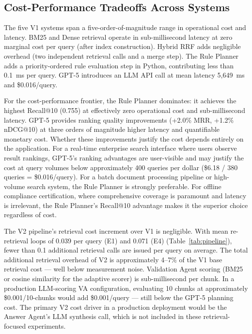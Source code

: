 \documentclass[11pt, a4paper]{article}
\begin{document}
\subsection{Cost-Performance Tradeoffs Across Systems}

The five V1 systems span a five-order-of-magnitude range in operational cost and latency. BM25 and Dense retrieval operate in sub-millisecond latency at zero marginal cost per query (after index construction). Hybrid RRF adds negligible overhead (two independent retrieval calls and a merge step). The Rule Planner adds a priority-ordered rule evaluation step in Python, contributing less than 0.1~ms per query. GPT-5 introduces an LLM API call at mean latency 5,649~ms and \$0.016/query.

For the cost-performance frontier, the Rule Planner dominates: it achieves the highest Recall@10 (0.755) at effectively zero operational cost and sub-millisecond latency. GPT-5 provides ranking quality improvements (+2.0\% MRR, +1.2\% nDCG@10) at three orders of magnitude higher latency and quantifiable monetary cost. Whether these improvements justify the cost depends entirely on the application. For a real-time enterprise search interface where users observe result rankings, GPT-5's ranking advantages are user-visible and may justify the cost at query volumes below approximately 400 queries per dollar (\$6.18 / 380 queries = \$0.016/query). For a batch document processing pipeline or high-volume search system, the Rule Planner is strongly preferable. For offline compliance certification, where comprehensive coverage is paramount and latency is irrelevant, the Rule Planner's Recall@10 advantage makes it the superior choice regardless of cost.

The V2 pipeline's retrieval cost increment over V1 is negligible. With mean re-retrieval loops of 0.039 per query (E1) and 0.071 (E4) (Table~\ref{tab:pipeline}), fewer than 0.1 additional retrieval calls are issued per query on average. The total additional retrieval overhead of V2 is approximately 4--7\% of the V1 base retrieval cost --- well below measurement noise. Validation Agent scoring (BM25 or cosine similarity for the adaptive scorer) is sub-millisecond per chunk. In a production LLM-scoring VA configuration, evaluating 10 chunks at approximately \$0.001/10-chunks would add \$0.001/query --- still below the GPT-5 planning cost. The primary V2 cost driver in a production deployment would be the Answer Agent's LLM synthesis call, which is not included in these retrieval-focused experiments.
\end{document}
